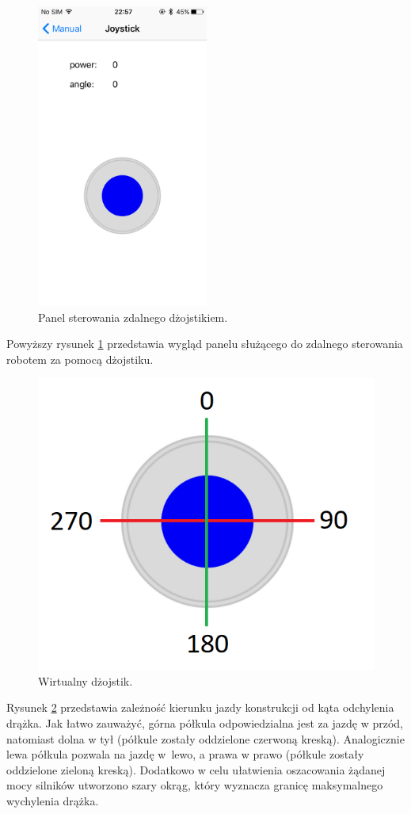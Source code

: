 \begin{figure}[H]
	\centering
		\includegraphics[width=0.75\linewidth, height=10cm, keepaspectratio, fbox]{pic05/joystick.PNG}
	\caption{Panel sterowania zdalnego dżojstikiem.}
	\label{fig:joystickview}	
\end{figure}

Powyższy rysunek \ref{fig:joystickview} przedstawia wygląd panelu służącego do zdalnego sterowania robotem za pomocą dżojstiku.

\begin{figure}[H]
	\centering
		\includegraphics[width=0.75\linewidth]{pic05/joy.png}
	\caption{Wirtualny dżojstik.}
	\label{fig:joystickdirections}	
\end{figure}

Rysunek \ref{fig:joystickdirections} przedstawia zależność kierunku jazdy konstrukcji od kąta odchylenia drążka. Jak łatwo zauważyć, górna półkula odpowiedzialna jest za jazdę w przód, natomiast dolna w tył (półkule zostały oddzielone czerwoną kreską). Analogicznie lewa półkula pozwala na jazdę w~lewo, a prawa w prawo (półkule zostały oddzielone zieloną kreską). Dodatkowo w celu ułatwienia oszacowania żądanej mocy silników utworzono szary okrąg, który wyznacza granicę maksymalnego wychylenia drążka.

